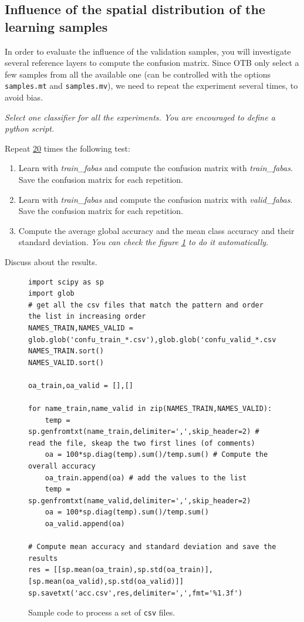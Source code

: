 \documentclass[a4paper,11pt,DIV=18]{scrartcl}
\begin{document}
\subsection{Influence of the spatial distribution of the learning samples}
\label{sec:orgheadline31}
In order to evaluate the influence of the validation samples, you will
investigate  several   reference  layers  to  compute   the  confusion
matrix. Since OTB only select a few samples from all the available one
(can be  controlled with  the options  \texttt{samples.mt} and  \texttt{samples.mv}), we
need to repeat the experiment several times, to avoid bias.

\emph{Select one classifier  for all the experiments. You  are encouraged to
define a python script.}

\begin{work}
Repeat \uline{20} times the following test:
\begin{enumerate}
\item Learn with \emph{train\_fabas} and compute the confusion matrix with
\emph{train\_fabas}. Save the confusion matrix for each repetition.
\item Learn  with  \emph{train\_fabas}  and compute  the  confusion  matrix  with
\emph{valid\_fabas}. Save the confusion matrix for each repetition.
\item Compute the average global accuracy and the mean class accuracy and
their standard deviation. \emph{You can check the figure \ref{orgspecialblock3} to do it automatically}.
\end{enumerate}


Discuss about the results. 
\end{work}

\begin{figure}
\begin{verbatim}
import scipy as sp
import glob
# get all the csv files that match the pattern and order the list in increasing order
NAMES_TRAIN,NAMES_VALID = glob.glob('confu_train_*.csv'),glob.glob('confu_valid_*.csv')
NAMES_TRAIN.sort()
NAMES_VALID.sort()

oa_train,oa_valid = [],[]

for name_train,name_valid in zip(NAMES_TRAIN,NAMES_VALID):
    temp = sp.genfromtxt(name_train,delimiter=',',skip_header=2) # read the file, skeap the two first lines (of comments)
    oa = 100*sp.diag(temp).sum()/temp.sum() # Compute the overall accuracy
    oa_train.append(oa) # add the values to the list
    temp = sp.genfromtxt(name_valid,delimiter=',',skip_header=2)
    oa = 100*sp.diag(temp).sum()/temp.sum()
    oa_valid.append(oa)
    
# Compute mean accuracy and standard deviation and save the results
res = [[sp.mean(oa_train),sp.std(oa_train)],[sp.mean(oa_valid),sp.std(oa_valid)]]
sp.savetxt('acc.csv',res,delimiter=',',fmt='%1.3f')
\end{verbatim}
\caption{\label{orgspecialblock3}
Sample code to process a set of \texttt{csv} files.}
\end{figure}
\end{document}
